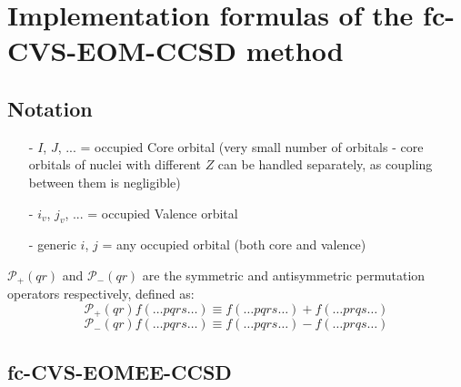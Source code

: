 \section{Implementation formulas of the fc-CVS-EOM-CCSD method}
\subsection*{Notation}
\begin{itemize}
\item[-]$I$, $J$, ... = occupied Core orbital  (very small number of orbitals - core orbitals of nuclei with different $Z$ can be handled separately, as coupling between them is negligible)
\item[-] $i_v$, $j_v$, ... = occupied Valence orbital 
\item[-] generic $i$, $j$ = any occupied orbital (both core and valence) 
\end{itemize}
$\mathcal{P}_+(qr)$ and $\mathcal{P}_-(qr)$ are the symmetric and antisymmetric permutation operators respectively, defined as:
\begin{equation}
\mathcal{P}_+(qr) f(\dots pqrs\dots ) \equiv f(\dots pqrs\dots ) + f(\dots prqs\dots ) 
\end{equation}
\begin{equation}
\mathcal{P}_-(qr) f(\dots pqrs\dots ) \equiv f(\dots pqrs\dots ) - f(\dots prqs\dots ) 
\end{equation}

 \subsection{fc-CVS-EOMEE-CCSD}
